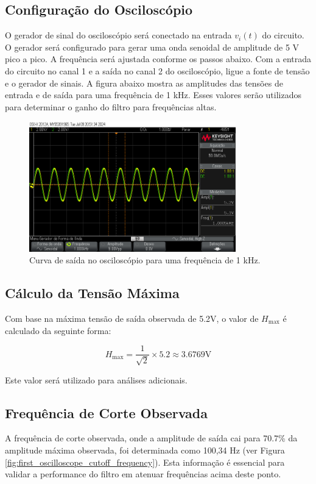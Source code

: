 \documentclass[
	12pt,				%
	openright,			%
	twoside,			%
	a4paper,			%
	english,			%
	french,				%
	spanish,			%
	brazil,				%
	]{abntex2}
\begin{document}
\pagebreak

\subsection{Configuração do Osciloscópio}

O gerador de sinal do osciloscópio será conectado na entrada \( v_i(t) \) do circuito. O gerador será configurado para gerar uma onda senoidal de amplitude de 5 V pico a pico. A frequência será ajustada conforme os passos abaixo. Com a entrada do circuito no canal 1 e a saída no canal 2 do osciloscópio, ligue a fonte de tensão e o gerador de sinais. A figura abaixo mostra as amplitudes das tensões de entrada e de saída para uma frequência de 1 kHz. Esses valores serão utilizados para determinar o ganho do filtro para frequências altas.

\begin{figure}[H]
    \centering
    \includegraphics[width=0.8\textwidth]{imgs/scope_7.png}
    \caption{Curva de saída no osciloscópio para uma frequência de 1 kHz.}
    \label{fig:high_frequency_output}
\end{figure}


\subsection{Cálculo da Tensão Máxima}

Com base na máxima tensão de saída observada de 5.2V, o valor de \( H_{\text{max}} \) é calculado da seguinte forma:

\begin{equation}
H_{\text{max}} = \frac{1}{\sqrt{2}} \times 5.2 \approx 3.6769 \text{V}
\end{equation}

Este valor será utilizado para análises adicionais.


\subsection{Frequência de Corte Observada}
A frequência de corte observada, onde a amplitude de saída cai para 70.7\% da amplitude máxima observada, foi determinada como 100,34 Hz (ver Figura \ref{fig:first_oscilloscope_cutoff_frequency}). Esta informação é essencial para validar a performance do filtro em atenuar frequências acima deste ponto.
\end{document}

